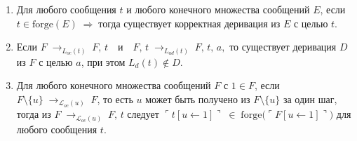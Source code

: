 \begin{enumerate}[label=(\arabic*), leftmargin=0pt, labelwidth=1.5em, labelsep=0.5em, itemindent=0em]
\item Для любого сообщения \(t\) и любого конечного множества сообщений \(E\), если
$t\in\mathrm{forge}(E)\;\Longrightarrow\;\text{тогда существует корректная деривация из }E\text{ с целью }t$.

\item Если $F \;\to_{L_{oc}(t)}\;F,\,t\quad\text{и}\quad F,\,t \;\to_{L_{ad}(t)}\;F,\,t,\,a,$ то существует деривация \(D\) из \(F\) с целью \(a\), при этом 
  \(L_{d}(t)\notin D\).

\item Для любого конечного множества сообщений \(F\) с \(1\in F\), если $F\setminus\{u\}\;\to_{\mathcal{L}_{oc}(u)}\;F$, то есть \(u\) может быть получено из \(F\setminus\{u\}\) за один шаг,   тогда из $F\;\to_{\mathcal{L}_{oc}(u)}\;F,\,t$ следует $\ulcorner t[u\leftarrow1]\urcorner \;\in\;\mathrm{forge}\bigl(\ulcorner F[u\leftarrow1]\urcorner\bigr)$
  для любого сообщения \(t\).
\end{enumerate}
